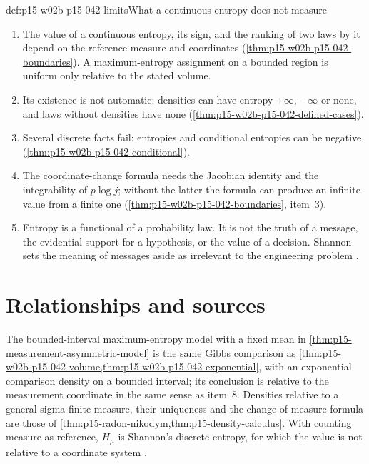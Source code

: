 \begin{hbwarning}{def:p15-w02b-p15-042-limits}{What a continuous entropy does not measure}
\begin{enumerate}
\item The value of a continuous entropy, its sign, and the ranking of two laws
      by it depend on the reference measure and coordinates
      (\cref{thm:p15-w02b-p15-042-boundaries}). A maximum-entropy assignment
      on a bounded region is uniform only relative to the stated volume.
\item Its existence is not automatic: densities can have entropy \(+\infty\),
      \(-\infty\) or none, and laws without densities have none
      (\cref{thm:p15-w02b-p15-042-defined-cases}).
\item Several discrete facts fail: entropies and conditional entropies can be
      negative (\cref{thm:p15-w02b-p15-042-conditional}).
\item The coordinate-change formula needs the Jacobian identity and the
      integrability of \(p\log j\); without the latter the formula can
      produce an infinite value from a finite one
      (\cref{thm:p15-w02b-p15-042-boundaries}, item~3).
\item Entropy is a functional of a probability law. It is not the truth of a
      message, the evidential support for a hypothesis, or the value of a
      decision. Shannon sets the meaning of messages aside as irrelevant to
      the engineering problem \cite[p.~1]{Shannon1948MathematicalTheory}.
\end{enumerate}
\end{hbwarning}

\section{Relationships and sources}
\label{sec:p15-w02b-p15-042-relationships}

The bounded-interval maximum-entropy model with a fixed mean in
\cref{thm:p15-measurement-asymmetric-model} is the same Gibbs comparison as
\cref{thm:p15-w02b-p15-042-volume,thm:p15-w02b-p15-042-exponential}, with
an exponential comparison density on a bounded interval; its conclusion is
relative to the measurement coordinate in the same sense as item~8. Densities
relative to a general sigma-finite measure, their uniqueness and the change of
measure formula are those of \cref{thm:p15-radon-nikodym,thm:p15-density-calculus}.
With counting measure as reference, \(H_\mu\) is Shannon's discrete entropy,
for which the value is not relative to a coordinate system
\cite[sec.~20, p.~37]{Shannon1948MathematicalTheory}.


